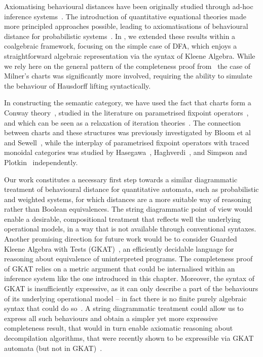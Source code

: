 Axiomatising behavioural distances have been originally studied through ad-hoc inference systems~\cite{Larsen:2011:Metrics,Argenio:2014:Axiomatizing}. The introduction of quantitative equational theories made more principled approaches possible, leading to axiomatisations of behavioural distance for probabilistic systems~\cite{Bacci:2018:Bisimilarity,Bacci:2018:Algebraic}. In , we extended these results within a coalgebraic framework, focusing on the simple case of DFA, which enjoys a straightforward algebraic representation via the syntax of Kleene Algebra. While we rely here on the general pattern of the completeness proof from~ the case of Milner's charts was significantly more involved, requiring the ability to simulate the behaviour of Hausdorff lifting syntactically.

In constructing the semantic category, we have used the fact that charts form a Conway theory~\cite{Esik:1999:Group}, studied in the literature on parametrised fixpoint operators~\cite{Haghverdi:2000:Categorical,Simpson:2000:Complete,Abramsky:2002:Geometry}, and which can be seen as a relaxation of iteration theories~\cite{Bloom:1993:Iteration}. The connection between charts and these structures was previously investigated by Bloom et al~\cite{Bloom:1993:Iteration} and Sewell~\cite{Sewell:1995:Algebra}, while the interplay of parametrised fixpoint operators with traced monoidal categories was studied by Hasegawa~\cite{Hasegawa:1997:Models}, Haghverdi~\cite{Haghverdi:2000:Categorical}, and Simpson and Plotkin~\cite{Simpson:2000:Complete} independently.

Our work constitutes a necessary first step towards a similar diagrammatic treatment of behavioural distance for quantitative automata, such as probabilistic and weighted systems, for which distances are a more suitable way of reasoning rather than Boolean equivalences. The string diagrammatic point of view would enable a desirable, compositional treatment that reflects well the underlying operational models, in a way that is not available through conventional syntaxes. Another promising direction for future work would be to consider Guarded Kleene Algebra with Tests (GKAT)~\cite{Smolka:2020:Guarded,Schmid:2021:Guarded}, an efficiently decidable language for reasoning about equivalence of uninterpreted programs. The completeness proof of GKAT relies on a metric argument that could be internalised within an inference system like the one introduced in this chapter. Moreover, the syntax of GKAT is insufficiently expressive, as it can only describe a part of the behaviours of its underlying operational model -- in fact there is no finite purely algebraic syntax that could do so~\cite{Cate:2025:Algebras}. A string diagrammatic treatment could allow us to express all such behaviours and obtain a simpler yet more expressive completeness result, that would in turn enable axiomatic reasoning about decompilation algorithms, that were recently shown to be expressible via GKAT automata (but not in GKAT)~\cite{Zhang:2025:CFGKAT}.


 